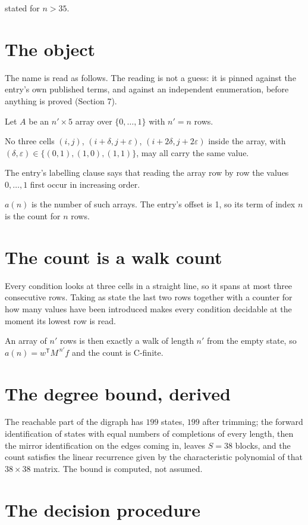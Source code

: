 \documentclass[11pt]{article}
\theoremstyle{definition}
\begin{document}
stated for $n > 35$.

\section{The object}

The name is read as follows. The reading is not a guess: it is pinned against the entry's own published terms, and against an independent enumeration, before anything is proved (Section 7).

Let $A$ be an $n' \times 5$ array over $\{0,\dots,1\}$ with $n' = n$ rows.

No three cells $(i,j)$, $(i{+}\delta,j{+}\varepsilon)$, $(i{+}2\delta,j{+}2\varepsilon)$ inside the array, with $(\delta,\varepsilon) \in \{(0,1), (1,0), (1,1)\}$, may all carry the same value.

The entry's labelling clause says that reading the array row by row the values $0,\dots,1$ first occur in increasing order.

$a(n)$ is the number of such arrays. The entry's offset is 1, so its term of index $n$ is the count for $n$ rows.

\section{The count is a walk count}

Every condition looks at three cells in a straight line, so it spans at most three consecutive rows. Taking as state the last two rows together with a counter for how many values have been introduced makes every condition decidable at the moment its lowest row is read.

An array of $n'$ rows is then exactly a walk of length $n'$ from the empty state, so $a(n) = w^{\mathsf T}M^{\,n'}f$ and the count is C-finite.

\section{The degree bound, derived}

The reachable part of the digraph has $199$ states, $199$ after trimming; the forward identification of states with equal numbers of completions of every length, then the mirror identification on the edges coming in, leaves $S = 38$ blocks, and the count satisfies the linear recurrence given by the characteristic polynomial of that $38\times38$ matrix. The bound is computed, not assumed.

\section{The decision procedure}
\end{document}

